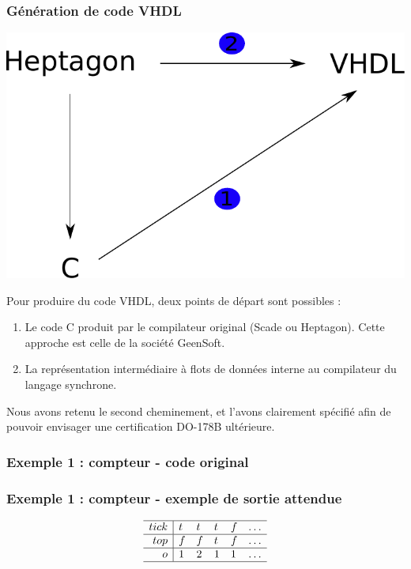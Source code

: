 \documentclass{beamer}
\newcommand{\scade}{{\sc Scade}}
\newcommand{\heptagon}{{\sc Heptagon}}
\begin{document}
\begin{frame}
  \frametitle{Génération de code VHDL}

  \begin{center}
    \includegraphics[scale=0.4]{sens_traduction.pdf}
  \end{center}

  Pour produire du code VHDL, deux points de départ sont possibles :

  \begin{enumerate}
  \item Le code C produit par le compilateur original (\scade{} ou
    \heptagon{}). Cette approche est celle de la société GeenSoft.
  \item La représentation intermédiaire à flots de données interne au
    compilateur du langage synchrone.
  \end{enumerate}

  \pause

  Nous avons retenu le second cheminement, et l'avons clairement spécifié afin
  de pouvoir envisager une certification DO-178B ultérieure.
\end{frame}

\begin{frame}
  \frametitle{Exemple 1 : compteur - code original}

  
\end{frame}


\begin{frame}
  \frametitle{Exemple 1 : compteur - exemple de sortie attendue}

  \[
  \begin{array}{r|llllllllllllllllllllllllllll}
    \hline
    tick & t & t & t & f & \dots \\
    \hline
    top & f & f & t & f & \dots \\
    \hline
    o & 1 & 2 & 1 & 1 & \dots \\
    \hline
  \end{array}
  \]
\end{frame}
\end{document}
